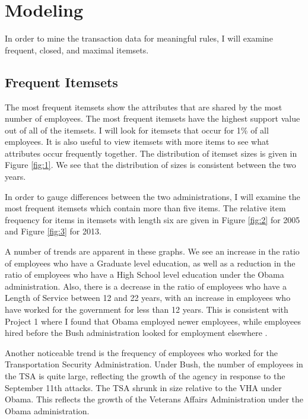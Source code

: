 \documentclass{article}
\begin{document}
\section{Modeling}
In order to mine the transaction data for meaningful rules, I will examine frequent, closed, and maximal itemsets.

    \subsection{Frequent Itemsets}
    The most frequent itemsets show the attributes that are shared by the most number of employees. The most frequent itemsets have the highest support value out of all of the itemsets. I will look for itemsets that occur for 1\% of all employees. It is also useful to view itemsets with more items to see what attributes occur frequently together. The distribution of itemset sizes is given in Figure \ref{fig:1}. We see that the distribution of sizes is consistent between the two years.
    \par
    In order to gauge differences between the two administrations, I will examine the most frequent itemsets which contain more than five items. The relative item frequency for items in itemsets with length six are given in Figure \ref{fig:2} for 2005 and Figure \ref{fig:3} for 2013.
    \par
    A number of trends are apparent in these graphs. We see an increase in the ratio of employees who have a Graduate level education, as well as a reduction in the ratio of employees who have a High School level education under the Obama administration.  Also, there is a decrease in the ratio of employees who have a Length of Service between 12 and 22 years, with an increase in employees who have worked for the government for less than 12 years. This is consistent with Project 1 where I found that Obama employed newer employees, while employees hired before the Bush administration looked for employment elsewhere \cite{proj1}.
    \par
    Another noticeable trend is the frequency of employees who worked for the Transportation Security Administration. Under Bush, the number of employees in the TSA is quite large, reflecting the growth of the agency in response to the September 11th attacks. The TSA shrunk in size relative to the VHA under Obama. This reflects the growth of the Veterans Affairs Administration under the Obama administration.
    \par
\end{document}
